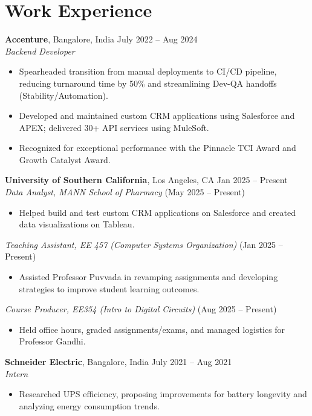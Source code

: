 \documentclass[letterpaper,10pt]{article}
\begin{document}
\section*{Work Experience}
\textbf{Accenture}, Bangalore, India \hfill July 2022 -- Aug 2024 \\
\textit{Backend Developer}
\begin{itemize} \itemsep -2pt
    \item Spearheaded transition from manual deployments to CI/CD pipeline, reducing turnaround time by 50\% and streamlining Dev-QA handoffs (Stability/Automation).
    \item Developed and maintained custom CRM applications using Salesforce and APEX; delivered 30+ API services using MuleSoft.
    \item Recognized for exceptional performance with the Pinnacle TCI Award and Growth Catalyst Award.
\end{itemize}

\vspace{-2pt}

\textbf{University of Southern California}, Los Angeles, CA \hfill Jan 2025 -- Present \\
\textit{Data Analyst, MANN School of Pharmacy} \hfill (May 2025 -- Present)
\begin{itemize} \itemsep -2pt
    \item Helped build and test custom CRM applications on Salesforce and created data visualizations on Tableau.
\end{itemize}
\textit{Teaching Assistant, EE 457 (Computer Systems Organization)} \hfill (Jan 2025 -- Present)
\begin{itemize} \itemsep -2pt
    \item Assisted Professor Puvvada in revamping assignments and developing strategies to improve student learning outcomes.
\end{itemize}
\textit{Course Producer, EE354 (Intro to Digital Circuits)} \hfill (Aug 2025 -- Present)
\begin{itemize} \itemsep -2pt
    \item Held office hours, graded assignments/exams, and managed logistics for Professor Gandhi.
\end{itemize}

\textbf{Schneider Electric}, Bangalore, India \hfill July 2021 -- Aug 2021 \\
\textit{Intern}
\begin{itemize} \itemsep -2pt
    \item Researched UPS efficiency, proposing improvements for battery longevity and analyzing energy consumption trends.
\end{itemize}
\end{document}
